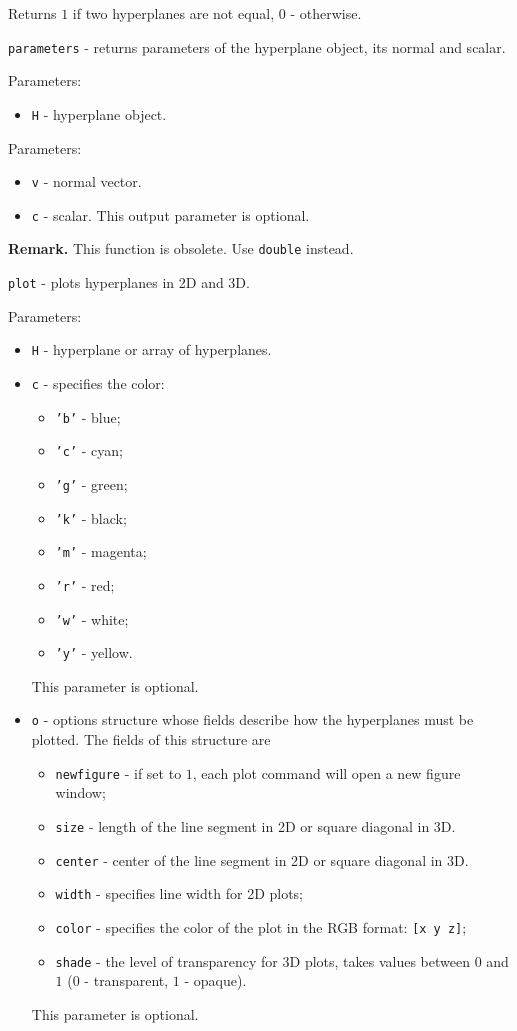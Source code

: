 \documentclass{report}
\begin{document}
Returns $1$ if two hyperplanes are not equal, $0$ - otherwise.



\newpage

{\Large {\tt parameters}} - returns parameters of the hyperplane object,
its normal and scalar.

Parameters:
\begin{itemize}
\item {\tt H} - hyperplane object.
\end{itemize}

Parameters:
\begin{itemize}
\item {\tt v} - normal vector.
\item {\tt c} - scalar. This output parameter is optional.
\end{itemize}

{\bf Remark.} This function is obsolete. Use {\tt double} instead.

\newpage

{\Large {\tt plot}} - plots hyperplanes in 2D and 3D.

Parameters:
\begin{itemize}
\item {\tt H} - hyperplane or array of hyperplanes.
\item {\tt c} - specifies the color:
\begin{itemize}
\item {\tt 'b'} - blue;
\item {\tt 'c'} - cyan;
\item {\tt 'g'} - green;
\item {\tt 'k'} - black;
\item {\tt 'm'} - magenta;
\item {\tt 'r'} - red;
\item {\tt 'w'} - white;
\item {\tt 'y'} - yellow.
\end{itemize}
This parameter is optional.
\item {\tt o} - options structure whose fields describe how the hyperplanes
must be plotted. The fields of this structure are
\begin{itemize}
\item {\tt newfigure} - if set to $1$, each plot command will open a new
figure window;
\item {\tt size} - length of the line segment in 2D or square diagonal in 3D.
\item {\tt center} - center of the line segment in 2D or square diagonal in 3D.
\item {\tt width} - specifies line width for 2D plots;
\item {\tt color} - specifies the color of the plot in the RGB format:
{\tt [x y z]};
\item {\tt shade} - the level of transparency for 3D plots, takes values
between $0$ and $1$ ($0$ - transparent, $1$ - opaque).
\end{itemize}
This parameter is optional.
\end{itemize}
\end{document}
